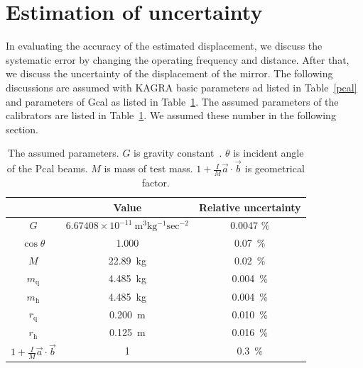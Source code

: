 \documentclass[A4]{spie}  %
\begin{document}
\section{Estimation of uncertainty} \label{sec:EST}
In evaluating the accuracy of the estimated displacement, we discuss the systematic error by changing the operating frequency and distance. After that, we discuss the uncertainty of the displacement of the mirror. 
The following discussions are assumed with KAGRA basic parameters ad listed in Table~\ref{pcal} and parameters of Gcal as listed in Table~\ref{sus}. The assumed parameters of the calibrators are listed in Table~\ref{sus}. We assumed these number in the following section.

\begin{table}
\begin{center}
\caption{\label{sus}The assumed parameters. $G$ is gravity constant~\cite{RevModPhys.88.035009}. $\theta$ is incident angle of the Pcal beams. $M$ is mass of test mass. $1+\frac{I}{M}\vec{a}\cdot \vec{b}$ is geometrical factor.}
\footnotesize
\begin{tabular}{ccc}
\hline
&Value&Relative uncertainty \\
\hline
$G$&$6.67408 \times 10^{-11}~\mathrm{m^3kg^{-1}sec^{-2}}$&0.0047 \%\\
$\cos{\theta}$ &1.000& 0.07~\%\\
$M$ &22.89~kg & 0.02~\%\\
$m_{\mathrm{q}}$&4.485~kg & 0.004~\%\\
$m_{\mathrm{h}}$& 4.485~kg &0.004~\%\\
$r_{\mathrm{q}}$&0.200~m & 0.010~\%\\
$r_{\mathrm{h}}$& 0.125~m & 0.016~\%\\
$1+\frac{I}{M}\vec{a}\cdot \vec{b}$& 1&0.3~\% \\
\hline
\end{tabular}\\
\end{center}
\end{table}
\end{document}

